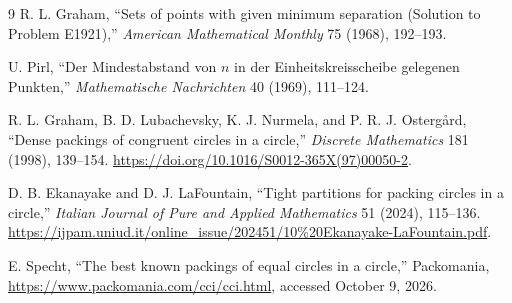 \documentclass[11pt]{article}
\theoremstyle{definition}
\begin{document}
\begin{thebibliography}{9}
R. L. Graham, ``Sets of points with given minimum separation (Solution to Problem E1921),''
\emph{American Mathematical Monthly} 75 (1968), 192--193.

U. Pirl, ``Der Mindestabstand von $n$ in der Einheitskreisscheibe gelegenen Punkten,''
\emph{Mathematische Nachrichten} 40 (1969), 111--124.

R. L. Graham, B. D. Lubachevsky, K. J. Nurmela, and P. R. J. Ostergård,
``Dense packings of congruent circles in a circle,'' \emph{Discrete Mathematics} 181 (1998), 139--154.
\url{https://doi.org/10.1016/S0012-365X(97)00050-2}.

D. B. Ekanayake and D. J. LaFountain, ``Tight partitions for packing circles in a circle,''
\emph{Italian Journal of Pure and Applied Mathematics} 51 (2024), 115--136.
\url{https://ijpam.uniud.it/online_issue/202451/10%20Ekanayake-LaFountain.pdf}.

E. Specht, ``The best known packings of equal circles in a circle,'' Packomania,
\url{https://www.packomania.com/cci/cci.html}, accessed October 9, 2026.
\end{thebibliography}
\end{document}
